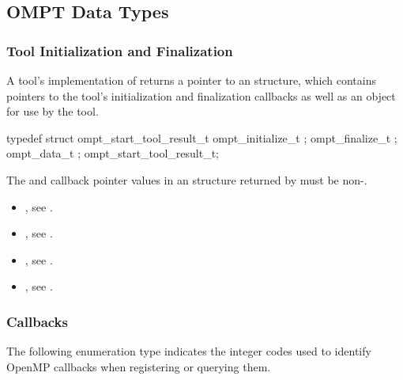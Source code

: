 \subsection{OMPT Data Types}
\label{sec:ompt-data-types}

\subsubsection{Tool Initialization and Finalization}
\label{sec:ompt_start_tool_result_t}

\summary
A tool's implementation of  returns a pointer to an
 structure, which
contains pointers to the tool's
initialization and finalization callbacks as well as an
 object for use by the tool.


\begin{ccppspecific}
\begin{omptOther}
typedef struct ompt_start_tool_result_t {
  ompt_initialize_t ;
  ompt_finalize_t ;
  ompt_data_t ;
} ompt_start_tool_result_t;
\end{omptOther}
\end{ccppspecific}


\restrictions

The  and  callback pointer values in an
 structure returned by  must be
non-.

\crossreferences
\begin{itemize}
\item {}, see .
\item {}, see .
\item {}, see .
\item {}, see .
\end{itemize}

\subsubsection{Callbacks}
\label{sec:ompt_callbacks_t}

The following enumeration type indicates the integer codes used to identify
OpenMP callbacks when registering or querying them.


